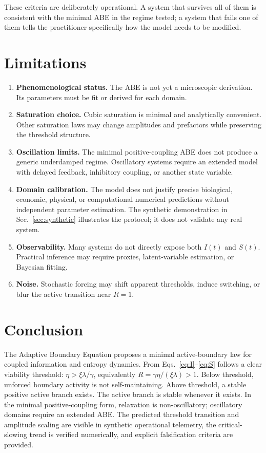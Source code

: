 \documentclass[11pt]{article}
\begin{document}
These criteria are deliberately operational. A system that survives all of them is consistent with the minimal ABE in the regime tested; a system that fails one of them tells the practitioner specifically how the model needs to be modified.

\clearpage
\section{Limitations}
\begin{enumerate}
  \item \textbf{Phenomenological status.} The ABE is not yet a microscopic derivation. Its parameters must be fit or derived for each domain.
  \item \textbf{Saturation choice.} Cubic saturation is minimal and analytically convenient. Other saturation laws may change amplitudes and prefactors while preserving the threshold structure.
  \item \textbf{Oscillation limits.} The minimal positive-coupling ABE does not produce a generic underdamped regime. Oscillatory systems require an extended model with delayed feedback, inhibitory coupling, or another state variable.
  \item \textbf{Domain calibration.} The model does not justify precise biological, economic, physical, or computational numerical predictions without independent parameter estimation. The synthetic demonstration in Sec.~\ref{sec:synthetic} illustrates the protocol; it does not validate any real system.
  \item \textbf{Observability.} Many systems do not directly expose both $I(t)$ and $S(t)$. Practical inference may require proxies, latent-variable estimation, or Bayesian fitting.
  \item \textbf{Noise.} Stochastic forcing may shift apparent thresholds, induce switching, or blur the active transition near $R=1$.
\end{enumerate}

\section{Conclusion}
The Adaptive Boundary Equation proposes a minimal active-boundary law for coupled information and entropy dynamics. From Eqs.~\eqref{eq:I}--\eqref{eq:S} follows a clear viability threshold: $\eta>\xi\lambda/\gamma$, equivalently $R=\gamma\eta/(\xi\lambda)>1$. Below threshold, unforced boundary activity is not self-maintaining. Above threshold, a stable positive active branch exists. The active branch is stable whenever it exists. In the minimal positive-coupling form, relaxation is non-oscillatory; oscillatory domains require an extended ABE. The predicted threshold transition and amplitude scaling are visible in synthetic operational telemetry, the critical-slowing trend is verified numerically, and explicit falsification criteria are provided.
\end{document}
